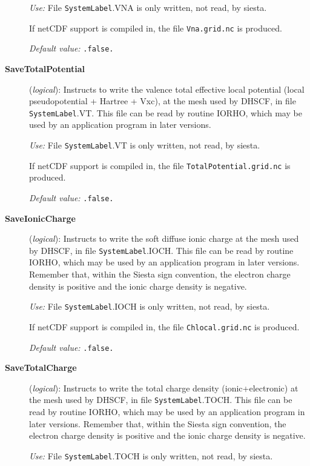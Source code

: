 \documentclass[11pt]{article}
\begin{document}
\begin{description}
{\it Use:} File {\tt SystemLabel}.VNA is only written, not read, by siesta.

If netCDF support is compiled in, the file {\tt Vna.grid.nc} is produced.

{\it Default value:} {\tt .false.}


\item[{\bf SaveTotalPotential}] ({\it logical}):
Instructs to write the valence total effective local potential
(local pseudopotential + Hartree + Vxc), at the
mesh used by DHSCF,
in file {\tt SystemLabel}.VT. This file can be read by routine IORHO,
which may be used by an application program in later versions.

{\it Use:} File {\tt SystemLabel}.VT is only written, not read, by siesta.

If netCDF support is compiled in, the file {\tt TotalPotential.grid.nc} is produced.

{\it Default value:} {\tt .false.}


\item[{\bf SaveIonicCharge}] ({\it logical}):
Instructs to write the soft diffuse ionic charge at the
mesh used by DHSCF,
in file {\tt SystemLabel}.IOCH. This file can be read by routine IORHO,
which may be used by an application program in later versions.
Remember that, within the {\sc Siesta} sign convention, the electron charge
density is positive and the ionic charge density is negative.


{\it Use:} File {\tt SystemLabel}.IOCH is only written, not read, by siesta.

If netCDF support is compiled in, the file {\tt Chlocal.grid.nc} is produced.

{\it Default value:} {\tt .false.}

\item[{\bf SaveTotalCharge}] ({\it logical}):
Instructs to write the total charge density (ionic+electronic) at the
mesh used by DHSCF,
in file {\tt SystemLabel}.TOCH. This file can be read by routine IORHO,
which may be used by an application program in later versions.
Remember that, within the {\sc Siesta} sign convention, the electron charge
density is positive and the ionic charge density is negative.

{\it Use:} File {\tt SystemLabel}.TOCH is only written, not read, by siesta.


\end{description}
\end{document}
